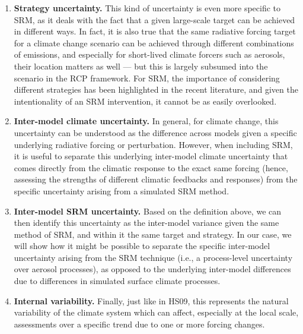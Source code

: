 \documentclass[draft]{agujournal2019}
\providecommand{\DIFadd}[1]{{\protect\color{blue}\uwave{#1}}} %
\providecommand{\DIFaddbegin}{} %
\providecommand{\DIFaddend}{} %
\begin{document}
\begin{enumerate}
    \item \textbf{Strategy uncertainty.} This kind of uncertainty is even more specific to SRM, as it deals with the fact that a given large-scale target can be achieved in different ways. In fact, it is also true that the same radiative forcing target for a climate change scenario can be achieved through different combinations of emissions, and especially for short-lived climate forcers such as aerosols, their location matters as well --- but this is largely subsumed into the scenario in the RCP framework. For SRM, the importance of considering different strategies has been highlighted in the recent literature, and given the intentionality of an SRM intervention, it cannot be as easily overlooked.

    \item \textbf{Inter-model climate \DIFaddbegin \DIFadd{response }\DIFaddend uncertainty.} In general, for climate change, this uncertainty can be understood as the difference across models given a specific underlying radiative forcing or perturbation. However, when including SRM, it is useful to separate this underlying inter-model climate \DIFaddbegin \DIFadd{response }\DIFaddend uncertainty that comes directly from the climatic response to the exact same forcing (hence, assessing the strengths of different climatic feedbacks and responses) from the specific uncertainty arising from a simulated SRM method.

    \item \textbf{Inter-model SRM uncertainty.} Based on the definition above, we can then identify this uncertainty as the inter-model variance given the same method of SRM, and within it the same target and strategy. In our case, we will show how it might be possible to separate the specific inter-model uncertainty arising from the SRM technique (i.e., a process-level uncertainty over aerosol processes), as opposed to the underlying inter-model differences due to differences in simulated surface climate processes.

    \item \textbf{Internal variability.} Finally, just like in HS09, this represents the natural variability of the climate system which can affect, especially at the local scale, assessments over a specific trend due to one or more forcing changes.
\end{enumerate}
\end{document}
